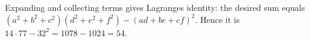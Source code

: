 Expanding and collecting terms gives Lagrange\textquotesingle s identity: the desired sum equals $(a^2+b^2+c^2)(d^2+e^2+f^2)-(ad+be+cf)^2$. Hence it is $14\cdot77-32^2=1078-1024=\boxed{54}$.
